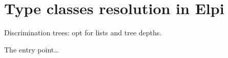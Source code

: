 \section{Type classes resolution in Elpi}

Discrimination trees: opt for lists and tree depths.

The entry point\dots

\cite{fissore2023}

\cite{Fissore2024}

